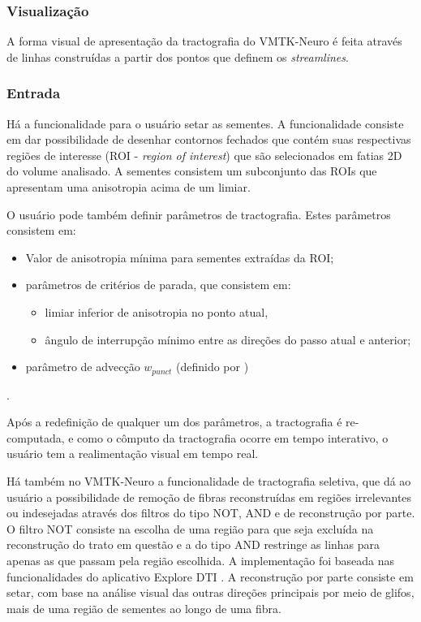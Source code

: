 \documentclass[
    12pt,                %
    oneside,            %
    a4paper,            %
    english,            %
    french,                %
    spanish,            %
    brazil                %
    ]{abntex2}
\begin{document}
\subsubsection{Visualização}

A forma visual de apresentação da tractografia do VMTK-Neuro é feita através de linhas construídas a partir dos pontos que definem os \textit{streamlines}.


\subsubsection{Entrada}

Há a funcionalidade para o usuário setar as sementes. A funcionalidade consiste em dar possibilidade de desenhar contornos fechados que contém suas respectivas regiões de interesse (ROI - \textit{region of interest}) que são selecionados em fatias 2D do volume analisado. A sementes consistem um subconjunto das ROIs que apresentam uma anisotropia acima de um limiar.

O usuário pode também definir parâmetros de tractografia. Estes parâmetros consistem em:
\begin{itemize}
    \item Valor de anisotropia mínima para sementes extraídas da ROI;
    \item parâmetros de critérios de parada, que consistem em:\begin{itemize}
        \item limiar inferior de anisotropia no ponto atual,
        \item ângulo de interrupção mínimo entre as direções do passo atual e anterior;
    \end{itemize}
    \item parâmetro de advecção $w_{punct}$ (definido por )
\end{itemize}.

Após a redefinição de qualquer um dos parâmetros, a tractografia é re-computada, e como o cômputo da tractografia ocorre em tempo interativo, o usuário tem a realimentação visual em tempo real.


Há também no VMTK-Neuro a funcionalidade de tractografia seletiva, que dá ao usuário a possibilidade de remoção de fibras reconstruídas em regiões irrelevantes ou indesejadas através dos filtros do tipo NOT, AND e de reconstrução por parte. O filtro NOT consiste na escolha de uma região para que seja excluída na reconstrução do trato em questão e a do tipo AND restringe as linhas para apenas as que passam pela região escolhida. A implementação foi  baseada nas funcionalidades do aplicativo Explore DTI \cite{exploredti2009}. A reconstrução por parte consiste em setar, com base na análise visual das outras direções principais por meio de glifos, mais de uma região de sementes ao longo de uma fibra.
\end{document}
